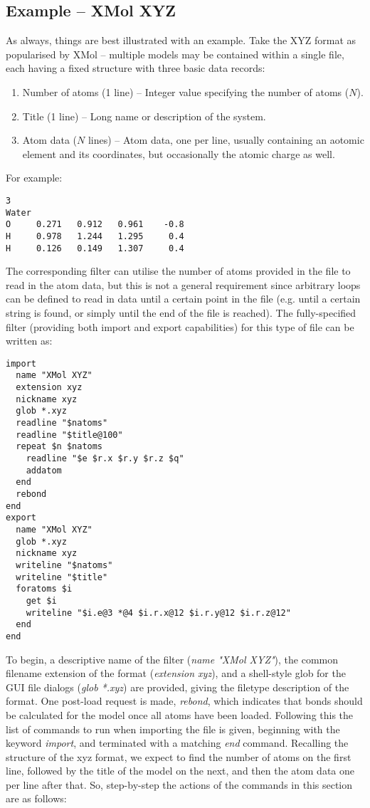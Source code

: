 \subsection{Example -- XMol XYZ}
\label{sec:filterex1}
As always, things are best illustrated with an example. Take the XYZ format as popularised by XMol -- multiple models may be contained within a single file, each having a fixed structure with three basic data records:

\begin{enumerate}
  \item Number of atoms (1 line) -- Integer value specifying the number of atoms ($N$).
  \item Title (1 line) -- Long name or description of the system.
  \item Atom data ($N$ lines) -- Atom data, one per line, usually containing an aotomic element and its coordinates, but occasionally the atomic charge as well.
\end{enumerate}

For example:

\begin{verbatim}
3
Water
O     0.271   0.912   0.961    -0.8
H     0.978   1.244   1.295     0.4
H     0.126   0.149   1.307     0.4
\end{verbatim}

The corresponding filter can utilise the number of atoms provided in the file to read in the atom data, but this is not a general requirement since arbitrary loops can be defined to read in data until a certain point in the file (e.g. until a certain string is found, or simply until the end of the file is reached). The fully-specified filter (providing both import and export capabilities) for this type of file can be written as:

\begin{verbatim}
import
  name "XMol XYZ"
  extension xyz
  nickname xyz
  glob *.xyz
  readline "$natoms"
  readline "$title@100"
  repeat $n $natoms
    readline "$e $r.x $r.y $r.z $q"
    addatom
  end
  rebond
end
export
  name "XMol XYZ"
  glob *.xyz
  nickname xyz
  writeline "$natoms"
  writeline "$title"
  foratoms $i
    get $i
    writeline "$i.e@3 *@4 $i.r.x@12 $i.r.y@12 $i.r.z@12"
  end
end
\end{verbatim}

To begin, a descriptive name of the filter ({\it name "XMol XYZ"}), the common filename extension of the format ({\it extension xyz}), and a shell-style glob for the GUI file dialogs ({\it glob *.xyz}) are provided, giving the filetype description of the format. One post-load request is made, {\it rebond}, which indicates that bonds should be calculated for the model once all atoms have been loaded. Following this the list of commands to run when importing the file is given, beginning with the keyword {\it import}, and terminated with a matching {\it end} command. Recalling the structure of the xyz format, we expect to find the number of atoms on the first line, followed by the title of the model on the next, and then the atom data one per line after that. So, step-by-step the actions of the commands in this section are as follows:



